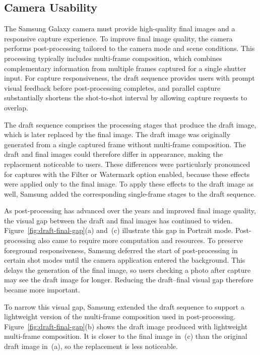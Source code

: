 \subsection{Camera Usability}
\label{sec:camera-usability}
\label{sec:draft-background}

The Samsung Galaxy camera must provide high-quality final images and a responsive capture experience.
To improve final image quality, the camera performs post-processing tailored to the camera mode and scene conditions.
This processing typically includes multi-frame composition, which combines complementary information from multiple frames captured for a single shutter input.
For capture responsiveness, the draft sequence provides users with prompt visual feedback before post-processing completes, and parallel capture substantially shortens the shot-to-shot interval by allowing capture requests to overlap.

The draft sequence comprises the processing stages that produce the draft image, which is later replaced by the final image.
The draft image was originally generated from a single captured frame without multi-frame composition.
The draft and final images could therefore differ in appearance, making the replacement noticeable to users.
These differences were particularly pronounced for captures with the Filter or Watermark option enabled, because these effects were applied only to the final image.
To apply these effects to the draft image as well, Samsung added the corresponding single-frame stages to the draft sequence.



As post-processing has advanced over the years and improved final image quality, the visual gap between the draft and final images has continued to widen.
Figure~\ref{fig:draft-final-gap}(a) and~(c) illustrate this gap in Portrait mode.
Post-processing also came to require more computation and resources.
To preserve foreground responsiveness, Samsung deferred the start of post-processing in certain shot modes until the camera application entered the background.
This delays the generation of the final image, so users checking a photo after capture may see the draft image for longer.
Reducing the draft--final visual gap therefore became more important.

To narrow this visual gap, Samsung extended the draft sequence to support a lightweight version of the multi-frame composition used in post-processing.
Figure~\ref{fig:draft-final-gap}(b) shows the draft image produced with lightweight multi-frame composition.
It is closer to the final image in~(c) than the original draft image in~(a), so the replacement is less noticeable.

